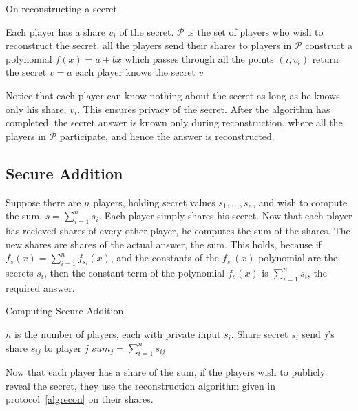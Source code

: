 \begin{algorithm}
\caption{On reconstructing a secret}
\label{algrecon}
\begin{algorithmic}
\REQUIRE Each player has a share $v_{i}$ of the secret.
	$\mathcal{P}$ is the set of players who wish to reconstruct the secret.
	\STATE all the players send their shares to players in $\mathcal{P}$
\ENDFOR
{}
	\STATE construct a polynomial $f(x) = a + bx$ which passes through all the points $(i,v_{i})$
	\STATE return the secret $v = a$
\ENDFOR
\ENSURE each player knows the secret $v$
\end{algorithmic}
\end{algorithm}

Notice that each player can know nothing about the secret as long as he knows only his share, $v_{i}$.
This ensures privacy of the secret. After the algorithm has completed, the secret answer is known only during
reconstruction, where all the players in $\mathcal{P}$ participate, and hence the answer is reconstructed.


\subsection{Secure Addition}
\label{sec:add}
Suppose there are $n$ players, holding secret values $s_{1}, ..., s_{n}$, and wish to compute
the sum, $s = \sum_{i = 1}^{n}s_{i}$. Each player simply shares his secret. Now that each player 
has recieved shares of every other player, he computes the sum of the shares. The new shares are
shares of the actual answer, the sum. This holds, because if $f_{s}(x) = \sum_{i = 1}^{n}f_{s_{i}}(x)$,
and the constants of the $f_{s_{i}}(x)$ polynomial are the secrets $s_{i}$, then the constant term
of the polynomial $f_{s}(x)$ is $\sum_{i = 1}^{n}s_{i}$, the required answer.


\begin{algorithm}
\caption{Computing Secure Addition}
\label{algadd}
\begin{algorithmic}
\REQUIRE $n$ is the number of players, each with private input $s_{i}$.
\STATE {}
	\STATE Share secret $s_{i}$
		\STATE send $j$'s share $s_{ij}$ to player $j$
	\ENDFOR
\ENDFOR
{}
	\STATE $sum_{j} = \sum_{i=1}^{n}s_{ij} $
\ENDFOR
\end{algorithmic}
\end{algorithm}

Now that each player has a share of the sum, if the players wish to publicly reveal the secret, 
they use the reconstruction algorithm given in protocol~\ref{algrecon} on their shares.


